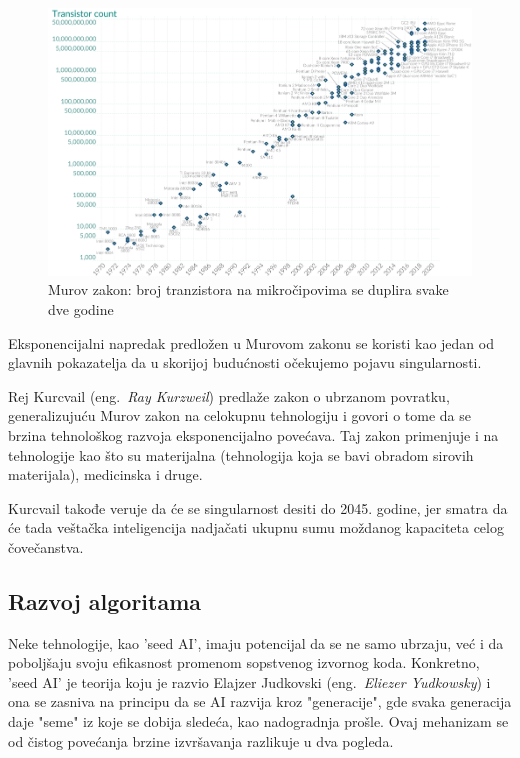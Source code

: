 \documentclass[a4paper]{article}
\begin{document}
\begin{figure}[h!]
\begin{center}
\includegraphics[scale=0.35]{moore.png}
\end{center}
\caption{Murov zakon: broj tranzistora na mikročipovima se duplira svake dve godine}
\label{fig:grafik}
\end{figure}

Eksponencijalni napredak predložen u Murovom zakonu se koristi kao jedan od glavnih pokazatelja da u skorijoj budućnosti očekujemo pojavu singularnosti.

Rej Kurcvail (eng.~{\em Ray Kurzweil}) predlaže zakon o ubrzanom povratku, generalizujuću Murov zakon na celokupnu tehnologiju i govori o tome da se brzina tehnološkog razvoja eksponencijalno povećava. Taj zakon primenjuje i na tehnologije kao što su materijalna (tehnologija koja se bavi obradom sirovih materijala), medicinska i druge.

Kurcvail takođe veruje da će se singularnost desiti do 2045. godine, jer smatra da će tada veštačka inteligencija nadjačati ukupnu sumu moždanog kapaciteta celog čovečanstva.

\subsection{Razvoj algoritama}

Neke tehnologije, kao 'seed AI', imaju potencijal da se ne samo ubrzaju, već i da poboljšaju svoju efikasnost promenom sopstvenog izvornog koda. Konkretno, 'seed AI' je teorija koju je razvio Elajzer Judkovski (eng.~{\em Eliezer Yudkowsky}) i ona se zasniva na principu da se AI razvija kroz "generacije", gde svaka generacija daje "seme" iz koje se dobija sledeća, kao nadogradnja prošle.
Ovaj mehanizam se od čistog povećanja brzine izvršavanja razlikuje u dva pogleda.
\end{document}
